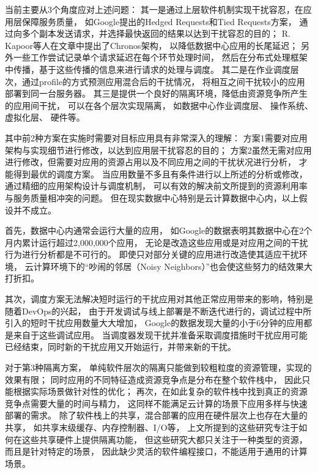 当前主要从3个角度应对上述问题：
其一是通过上层软件机制实现干扰容忍，在应用层保障服务质量，
如Google提出的Hedged Requests和Tied Requests方案\cite{dean_tail_2013}，
通过向多个副本发送请求，并选择最快返回的结果以达到干扰容忍的目的；
R. Kapoor等人在文章\cite{Kapoor:2012:Chronos}中提出了Chronos架构，
以降低数据中心应用的长尾延迟；
另外一些工作\cite{timecard:2013, d2p:2014}尝试记录单个请求延迟在每个环节处理时间，
然后在分布式处理框架中传播，基于这些传播的信息来进行请求的处理与调度。
其二是在作业调度层次，通过profile的方式预测应用混合后的干扰情况，
将相互之间干扰较小的应用部署到同一台服务器\cite{mars_bubble-up:_2011, kambadur_measuring_2012}。
其三是提供一个良好的隔离环境，降低由资源竞争所产生的应用间干扰，
可以在各个层次实现隔离，
如数据中心作业调度层\cite{Hindman:2011:Mesos, Schwarzkopf_omega_2013, borg:2015}、
操作系统\cite{cgroup, lin_gaining_2008, tam_managing_2007, liu_software_2012, Liu:2014:ISCA}、
虚拟化层\cite{Xu:2013:Bobtail:, Xu:2013:SMALL}、
硬件\cite{kasture_ubik:_2014, sanchez_vantage:_2011, sanchez_zcache:_2010, qureshi_utility-based_2006, muralidhara_reducing_2011}等。


其中前2种方案在实施时需要对目标应用具有非常深入的理解：
方案1需要对应用架构与实现细节进行修改，以达到应用层干扰容忍的目的；
方案2虽然无需对应用进行修改，但需要对应用的资源占用以及不同应用之间的干扰状况进行分析，
才能得到最优的调度方案。
当应用数量不多且有条件进行以上所述的分析或修改，通过精细的应用架构设计与调度机制，
可以有效的解决前文所提到的资源利用率与服务质量相冲突的问题。
但在现实数据中心特别是云计算数据中心内，以上假设并不成立。

首先，数据中心内通常会运行大量的应用，
如Google的数据\cite{Reiss_googletrace_2012}表明其数据中心在2个月内累计运行超过2,000,000个应用，
无论是改造这些应用或是对应用之间的干扰行为进行分析都是不可行的。
即使只对部分关键的应用进行改造使其适应干扰环境，
云计算环境下的``吵闹的邻居（Noisy Neighbors）''也会使这些努力的结效果大打折扣。

其次，调度方案无法解决短时运行的干扰应用对其他正常应用带来的影响，特别是随着DevOps的兴起，
由于开发调试与线上部署是不断迭代进行的，调试过程中所引入的短时干扰应用数量大大增加，
Google的数据\cite{Reiss_googletrace_2012}发现大量的小于6分钟的应用都是来自于这些调试应用。
当调度器发现干扰并准备采取调度措施时干扰应用可能已经结束，同时新的干扰应用又开始运行，并带来新的干扰。

对于第3种隔离方案，
单纯软件层次的隔离只能做到较粗粒度的资源管理，实现的效果有限；
同时应用的不同特征造成资源竞争点是分布在整个软件栈中，
因此只能根据实际场景做针对性的优化；
再次，在如此复杂的软件栈中找到真正的资源竞争点需要大量的时间与精力，
这同样不能满足云计算的场景下应用多样与快速部署的需求。
除了软件栈上的共享，混合部署的应用在硬件层次上也存在大量的共享，
如共享末级缓存、内存控制器、I/O等，
上文所提到的这些研究专注于如何在这些共享硬件上提供隔离功能，
但这些研究大都只关注于一种类型的资源，而且是针对特定的场景，
因此缺少灵活的软件编程接口，不能适用于通用的计算场景。

